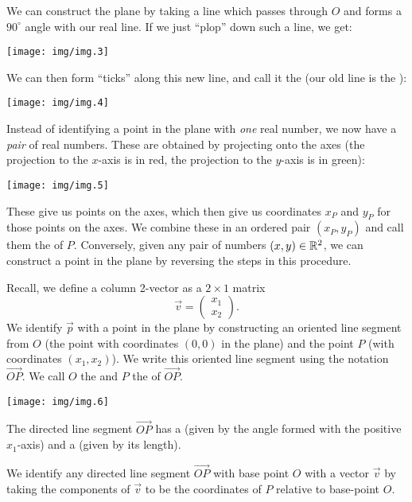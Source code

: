 We can construct the plane by taking a line which passes through $O$ and
forms a $90^{\circ}$ angle with our real line. If we just ``plop'' down
such a line, we get:
\begin{center}
\texttt{[image: img/img.3]}
\end{center}
We can then form ``ticks'' along this new line, and call it the
 (our old line is the ):
\begin{center}
\texttt{[image: img/img.4]}
\end{center}
Instead of identifying a point in the plane with \emph{one} real number,
we now have a \emph{pair} of real numbers. These are obtained by
projecting onto the axes (the projection to the $x$-axis is in red, the
projection to the $y$-axis is in green):
\begin{center}
\texttt{[image: img/img.5]}
\end{center}
These give us points on the axes, which then give us coordinates $x_{P}$
and $y_{P}$ for those points on the axes. We combine these in an ordered
pair $(x_{P}, y_{P})$ and call them the  of $P$.
Conversely, given any pair of numbers $(x,y)\in\mathbb{R}^{2}$, we can
construct a point in the plane by reversing the steps in this procedure.

Recall, we define a column 2-vector as a $2\times1$ matrix
\begin{equation}
\vec{v} = \begin{pmatrix}x_{1}\\x_{2}
\end{pmatrix}.
\end{equation}
We identify $\vec{p}$ with a point in the plane by constructing an
oriented line segment from $O$ (the point with coordinates $(0,0)$ in
the plane) and the point $P$ (with coordinates $(x_{1},x_{2})$). We
write this oriented line segment using the notation
$\overrightarrow{OP}$. We call $O$ the  and $P$ the
 of $\overrightarrow{OP}$.
\begin{center}
\texttt{[image: img/img.6]}
\end{center}
The directed line segment $\overrightarrow{OP}$ has a  (given
by the angle formed with the positive $x_{1}$-axis) and a
 (given by its length).

We identify any directed line segment $\overrightarrow{OP}$ with base
point $O$ with a vector $\vec{v}$ by taking the components of $\vec{v}$
to be the coordinates of $P$ relative to base-point $O$.

